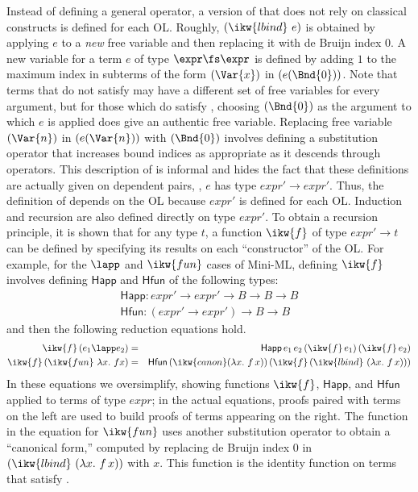 \documentclass[final]{svjour3}
\begin{document}
Instead of defining a general  operator, a version of
 that does not rely on  classical constructs  is defined
for each OL\@.  Roughly, $(\ikw{lbind}~e)$ is obtained by applying $e$
to a \emph{new} free variable and then replacing it with de Bruijn
index $0$.  A new variable for a term $e$ of type $\expr\fs\expr$ is
defined by adding $1$ to the maximum index in subterms of the form
$(\Var{x})$ in $(e(\Bnd{0}))$. Note that terms that do not satisfy
 may have a different set of free variables for every
argument, but for those which do satisfy , choosing
$(\Bnd{0})$ as the argument to which $e$ is applied does give an
authentic free variable.  Replacing free variable $(\Var{n})$ in
$(e(\Var{n}))$ with $(\Bnd{0})$ involves defining a substitution operator that increases bound indices as appropriate as it descends
through  operators.  This description of  is
informal and hides the fact that these definitions are actually given
on dependent pairs, \ie, $e$ has type $expr'\to expr'$.
Thus, the definition of  depends on the OL because $expr'$
is defined for each OL\@. 
Induction and recursion are also defined directly on type $expr'$.  To
obtain a recursion principle, it is shown that for any type $t$, a
function $\ikw{f}$ of type $expr'\to t$ can be defined by
specifying its results on each ``constructor'' of the OL\@. For example,
for the $\lapp$ and $\ikw{fun}$ cases of Mini-ML, defining
$\ikw{f}$ involves defining $\mathsf{Happ}$ and $\mathsf{Hfun}$ of
the following types:
$$\begin{array}{l}
\mathsf{Happ}: expr' \to expr' \to B \to B
  \to B\\
\mathsf{Hfun}: (expr' \to expr') \to B \to B
\end{array}$$
and then the following reduction equations hold.
\begin{eqnarray*}
\ikw{f}\,(e_1 \lapp e_2)& =&
   \mathsf{Happ}\,e_1\,e_2\,(\ikw{f}\,e_1)\,(\ikw{f}\,e_2)\\
\ikw{f}\,(\ikw{fun}~\lambda x.\ fx)& = &
    \mathsf{Hfun}\,(\ikw{canon}(\lambda x.\ f\,x))\,
        (\ikw{f}\,(\ikw{lbind}~(\lambda x.\ f\,x)))
\end{eqnarray*}
In these equations we oversimplify, showing functions $\ikw{f}$,
$\mathsf{Happ}$, and $\mathsf{Hfun}$ applied to terms of type $expr$;
in the actual equations, proofs paired with terms on the left are used
to build proofs of terms appearing on the right.  The 
function in the equation for $\ikw{fun}$ uses another substitution
operator to obtain a ``canonical form,'' computed by replacing de
Bruijn index $0$ in $(\ikw{lbind}~(\lambda x.\ f\,x))$ with $x$.  This
function is the identity function on terms that satisfy .
\end{document}
